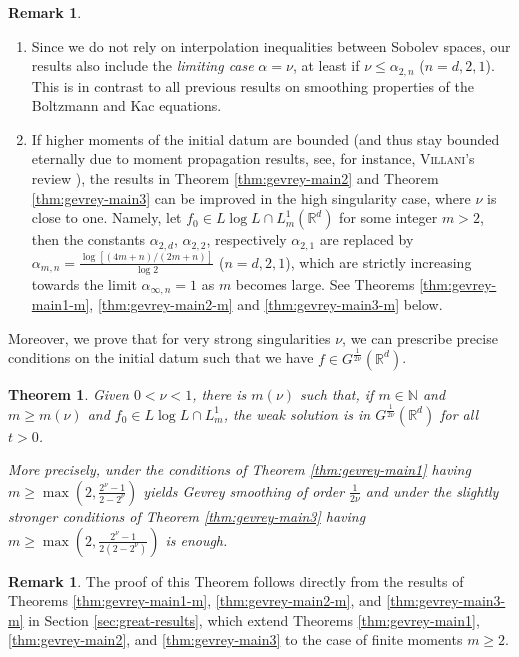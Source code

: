 \documentclass[11pt,a4paper,reqno]{amsart}
\theoremstyle{plain}
\newtheorem{theorem}[proposition]{Theorem}
\theoremstyle{definition}
\newtheorem{remark}[proposition]{Remark}
\begin{document}
\begin{remark}\label{rem:general-m}
\begin{enumerate}[label=(\roman*)]
	\item Since we do not rely on interpolation inequalities between Sobolev spaces, our results also include the \emph{limiting case} $\alpha=\nu$, at least if $\nu\leq \alpha_{2,n}$ ($n=d, 2, 1$). This is in contrast to all previous results on smoothing properties of the Boltzmann and Kac equations.
	\item If higher moments of the initial datum are bounded (and thus stay bounded eternally due to moment propagation results, see, for instance, \textsc{Villani}'s review \cite{Vil02}), the results in Theorem \ref{thm:gevrey-main2} and Theorem \ref{thm:gevrey-main3} can be improved in the high singularity case, where $\nu$ is close to one. Namely, let $f_0\in L\log L \cap L^1_m ({\mathbb{R}}^d)$ for some integer $m >2$, then the constants $\alpha_{2,d}$, $\alpha_{2,2}$, respectively $\alpha_{2,1}$ are replaced by $\alpha_{m,n} = \frac{\log[(4m+n)/(2m+n)]}{\log 2}$ ($n=d, 2, 1$), which are strictly increasing towards the limit $\alpha_{\infty,n} = 1$ as $m$ becomes large. See Theorems \ref{thm:gevrey-main1-m}, \ref{thm:gevrey-main2-m} and \ref{thm:gevrey-main3-m} below.
\end{enumerate}	
\end{remark}

Moreover, we prove that for very strong singularities $\nu$, we can prescribe precise conditions on the initial datum such that we have $f\in G^{\frac{1}{2\nu}}({\mathbb{R}}^d)$.
\begin{theorem}
	Given $0<\nu<1$, there is $m(\nu)$ such that, if $m\in {\mathbb{N}}$ and $m\ge m(\nu)$ and $f_0\in L\log L \cap L^1_m$, the weak solution is in $G^{\frac{1}{2\nu}}({\mathbb{R}}^d)$ for all $t>0$.
	
	More precisely, under the conditions of Theorem \ref{thm:gevrey-main1}  having  
	$m \ge  \max\left ( 2, \frac{2^\nu -1}{2-2^\nu} \right)$ yields Gevrey smoothing of order $\frac{1}{2\nu}$ and under the slightly stronger conditions of Theorem \ref{thm:gevrey-main3} having   
	  $m \ge  \max\left ( 2, \frac{2^\nu -1}{2(2-2^\nu)} \right)$ is enough.  
\end{theorem}

\begin{remark} 
The proof of this Theorem follows directly from the results of Theorems \ref{thm:gevrey-main1-m},  \ref{thm:gevrey-main2-m}, and \ref{thm:gevrey-main3-m}  in Section \ref{sec:great-results}, which extend Theorems \ref{thm:gevrey-main1}, \ref{thm:gevrey-main2}, and \ref{thm:gevrey-main3} to the case of finite moments $m\ge2$.
\end{remark}
\end{document}
